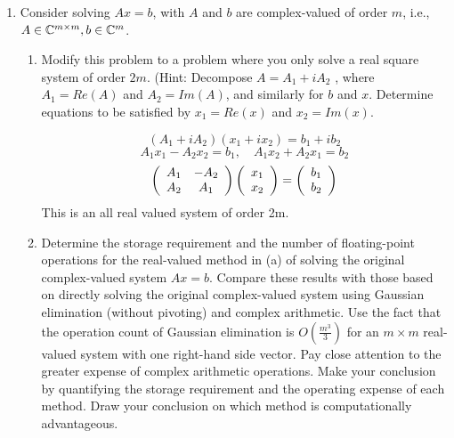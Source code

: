 \documentclass{article}
\begin{document}
\begin{enumerate}
\begin{enumerate}
\begin{proof}
\end{proof}
\end{enumerate}

\item Consider solving $Ax = b$, with $A$ and $b$ are complex-valued of order $m$, i.e., $A \in \mathbb{C}^{m\times m}, b \in \mathbb{C}^m$.
\begin{enumerate}
\item Modify this problem to a problem where you only solve a real square system of order $2m$. (Hint: Decompose $A = A_1 + iA_2$ , where $A_1 = Re(A)$ and $A_2 = Im(A)$, and similarly for $b$ and $x$. Determine equations to be satisfied by $x_1 = Re(x)$ and $x_2 = Im(x)$.

\[
    (A_1 + i A_2)(x_1 + ix_2) = b_1 + i b_2
\]
\[
    A_1x_1 - A_2x_2 = b_1, \quad A_1x_2 + A_2x_1 = b_2
\]
\[
    \left(\begin{array}{c c}
    A_1 & -A_2 \\
    A_2 & A_1
    \end{array}\right) 
    \left(\begin{array}{c}
    x_1 \\ x_2 \end{array}\right)
    = \left(\begin{array}{c}
    b_1 \\ b_2 \end{array}\right)
\]
This is an all real valued system of order 2m.

\item Determine the storage requirement and the number of floating-point operations for the real-valued method in (a) of solving the original complex-valued system $Ax = b$. Compare these results with those based on directly solving the original complex-valued system using Gaussian elimination (without pivoting) and complex arithmetic. Use the fact that the operation count of Gaussian elimination is $O\left(\frac{m^3}{3}\right)$ for an $m \times m$ real-valued system with one right-hand side vector. Pay close attention to the greater expense of complex arithmetic operations. Make your conclusion by quantifying the storage requirement and the operating expense of each method. Draw your conclusion on which method is computationally advantageous.


\end{enumerate}
\end{enumerate}
\end{document}
